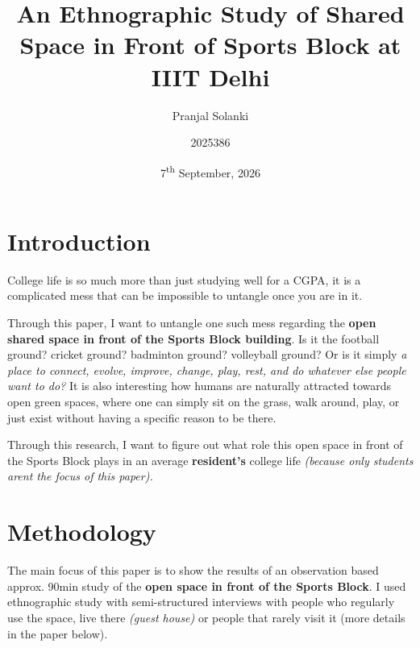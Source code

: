 \documentclass[twocolumn, 12pt]{article}
\begin{document}
\author{Pranjal Solanki \and 2025386}
\title{An Ethnographic Study of Shared Space in Front of Sports Block at IIIT Delhi}
\date{7\textsuperscript{th} September, 2026}


\maketitle



\tableofcontents


\section{Introduction}

College life is so much more than just studying well for a CGPA, 
it is a complicated mess that can be impossible to untangle once you are in it.

Through this paper, I want to untangle one such mess regarding the 
\textbf{open shared space in front of the Sports Block building}. 
Is it the football ground? cricket ground? badminton ground? volleyball ground? 
Or is it simply \textit{a place to connect, evolve, improve, change, play, rest, and do whatever else people want to do?} 
It is also interesting how humans are naturally attracted towards open green spaces, where one can simply sit on the grass, walk around, play, or just exist without having a specific reason to be there.\cite{biophilia}

Through this research, I want to figure out what role this open space in front of the Sports Block plays in an average \textbf{resident's} college life \textit{(because only students arent the focus of this paper).}


\section{Methodology}

The main focus of this paper is to show the results of an observation based approx. 
90min study of the \textbf{open space in front of the Sports Block}. 
I used ethnographic study with semi-structured interviews with people who regularly use the space, 
live there \textit{(guest house)} or people that rarely visit it (more details in the paper below). 
\end{document}
